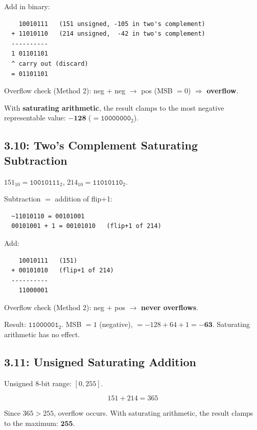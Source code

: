 Add in binary:
\begin{verbatim}
    10010111   (151 unsigned, -105 in two's complement)
  + 11010110   (214 unsigned,  -42 in two's complement)
  ----------
  1 01101101
  ^ carry out (discard)
  = 01101101
\end{verbatim}

Overflow check (Method 2): neg $+$ neg $\to$ pos (MSB $= 0$)
$\Rightarrow$ \textbf{overflow}.

With \textbf{saturating arithmetic}, the result clamps to the most negative
representable value: $\mathbf{-128}$ ($= \texttt{10000000}_2$).

\subsection*{3.10: Two's Complement Saturating Subtraction}
\hypertarget{sol-3.10}{}

$151_{10} = \texttt{10010111}_2$, \;
$214_{10} = \texttt{11010110}_2$.

Subtraction $= $ addition of flip+1:
\begin{verbatim}
  ~11010110 = 00101001
  00101001 + 1 = 00101010   (flip+1 of 214)
\end{verbatim}

Add:
\begin{verbatim}
    10010111   (151)
  + 00101010   (flip+1 of 214)
  ----------
    11000001
\end{verbatim}

Overflow check (Method 2): neg $+$ pos $\to$ \textbf{never overflows}.

Result: $\texttt{11000001}_2$. MSB $= 1$ (negative),
$= -128 + 64 + 1 = \mathbf{-63}$.
Saturating arithmetic has no effect.

\subsection*{3.11: Unsigned Saturating Addition}
\hypertarget{sol-3.11}{}

Unsigned 8-bit range: $[0, 255]$.

\[ 151 + 214 = 365 \]

Since $365 > 255$, overflow occurs. With saturating arithmetic, the result
clamps to the maximum: $\mathbf{255}$.
